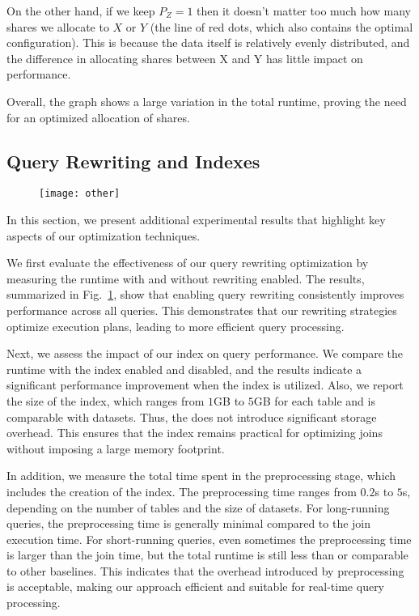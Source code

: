 On the other hand, if we keep $P_Z =1$ then it doesn't matter too much how many shares we allocate to $X$ or $Y$ (the line of red dots, which also contains the optimal configuration).  This is because the data itself is relatively evenly distributed, and the difference in allocating shares between X and Y has little impact on performance.

Overall, the graph shows a large variation in the total runtime, proving the need for an optimized allocation of shares.

\subsection{Query Rewriting and Indexes}

\begin{figure}[t]
	\centering
		  \texttt{[image: other]}
		  \caption{}
		  \label{fig:other}
\end{figure}

In this section, we present additional experimental results that highlight key aspects of our optimization techniques.

We first evaluate the effectiveness of our query rewriting optimization by measuring the runtime with and without rewriting enabled. The results, summarized in Fig.~\ref{fig:other}, show that enabling query rewriting consistently improves performance across all queries. This demonstrates that our rewriting strategies optimize execution plans, leading to more efficient query processing. 

Next, we assess the impact of our \indexlayout index on query performance. We compare the runtime with the \indexlayout index enabled and disabled, and the results indicate a significant performance improvement when the index is utilized. Also, we report the size of the \indexlayout index, which ranges from $1$GB to $5$GB for each table and is comparable with datasets. Thus, the \indexlayout does not introduce significant storage overhead. This ensures that the index remains practical for optimizing joins without imposing a large memory footprint.

In addition, we measure the total time spent in the preprocessing stage, which includes the creation of the \indexlayout index. The preprocessing time ranges from $0.2$s to $5$s, depending on the number of tables and the size of datasets. For long-running queries, the preprocessing time is generally minimal compared to the join execution time. For short-running queries, even sometimes the preprocessing time is larger than the join time, but the total runtime is still less than or comparable to other baselines. This indicates that the overhead introduced by preprocessing is acceptable, making our approach efficient and suitable for real-time query processing. 

